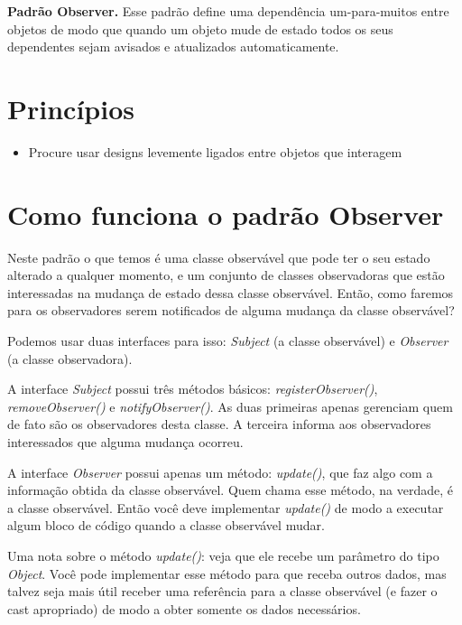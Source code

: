 \documentclass[a4paper,11pt]{report}
\begin{document}
\textbf{Padrão Observer.} Esse padrão define uma dependência um-para-muitos entre objetos de modo que quando um objeto mude de estado todos os seus dependentes sejam avisados e atualizados automaticamente.

\section{Princípios}

\begin{itemize}
\item Procure usar designs levemente ligados entre objetos que interagem
\end{itemize}

\section{Como funciona o padrão Observer}

Neste padrão o que temos é uma classe observável que pode ter o seu estado alterado a qualquer momento, e um conjunto de classes observadoras que estão interessadas na mudança de estado dessa classe observável. Então, como faremos para os observadores serem notificados de alguma mudança da classe observável?

Podemos usar duas interfaces para isso: \textit{Subject} (a classe observável) e \textit{Observer} (a classe observadora).

A interface \textit{Subject} possui três métodos básicos: \textit{registerObserver()}, \textit{removeObserver()} e \textit{notifyObserver()}. As duas primeiras apenas gerenciam quem de fato são os observadores desta classe. A terceira informa aos observadores interessados que alguma mudança ocorreu.\\


A interface \textit{Observer} possui apenas um método: \textit{update()}, que faz algo com a informação obtida da classe observável. Quem chama esse método, na verdade, é a classe observável. Então você deve implementar \textit{update()} de modo a executar algum bloco de código quando a classe observável mudar.\\


Uma nota sobre o método \textit{update()}: veja que ele recebe um parâmetro do tipo \textit{Object}. Você pode implementar esse método para que receba outros dados, mas talvez seja mais útil receber uma referência para a classe observável (e fazer o cast apropriado) de modo a obter somente os dados necessários.
\end{document}

